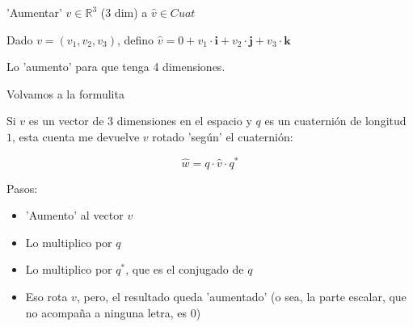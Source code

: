 \documentclass[10pt]{beamer}
\def\R{\mathbb{R}}
\begin{document}
\begin{frame}{'Aumentar' $v \in \R^3$ (3 dim) a $\hat{v} \in Cuat$ }



Dado $v = (v_1,v_2,v_3)$, defino $\hat{v}= 0 + v_1 \cdot \textbf{i} + v_2 \cdot \textbf{j} + v_3 \cdot \textbf{k}$ \pause

Lo 'aumento' para que tenga 4 dimensiones.


	
\end{frame}

\begin{frame}{Volvamos a la formulita}

Si $v$ es un vector de 3 dimensiones en el espacio y $q$ es un cuaternión de longitud $1$, esta cuenta me devuelve $v$ rotado 'según' el cuaternión:

$$\hat{w} = q \cdot \hat{v} \cdot q^*$$ \pause

Pasos:

\begin{itemize}
	\item 'Aumento' al vector $v$
	\item Lo multiplico por $q$
	\item Lo multiplico por $q^*$, que es el conjugado de $q$
	\item Eso rota $v$, pero, el resultado queda 'aumentado' (o sea, la parte escalar, que no acompaña a ninguna letra, es $0$)
	
	
\end{itemize}
\end{frame}
\end{document}
